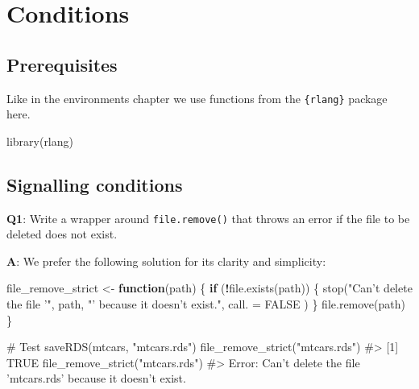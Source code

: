 \documentclass[
]{krantz}
\makeatletter
\newenvironment{Shaded}{\begin{snugshade}}{\end{snugshade}}
\newcommand{\CommentTok}[1]{\textcolor[rgb]{0.56,0.35,0.01}{\textit{#1}}}
\newcommand{\ControlFlowTok}[1]{\textcolor[rgb]{0.13,0.29,0.53}{\textbf{#1}}}
\newcommand{\DataTypeTok}[1]{\textcolor[rgb]{0.13,0.29,0.53}{#1}}
\newcommand{\KeywordTok}[1]{\textcolor[rgb]{0.13,0.29,0.53}{\textbf{#1}}}
\newcommand{\NormalTok}[1]{#1}
\newcommand{\OperatorTok}[1]{\textcolor[rgb]{0.81,0.36,0.00}{\textbf{#1}}}
\newcommand{\OtherTok}[1]{\textcolor[rgb]{0.56,0.35,0.01}{#1}}
\newcommand{\StringTok}[1]{\textcolor[rgb]{0.31,0.60,0.02}{#1}}
\newenvironment{kframe}{%
\medskip{}
\setlength{\fboxsep}{.8em}
 \def\at@end@of@kframe{}%
 \ifinner\ifhmode%
  \def\at@end@of@kframe{\end{minipage}}%
  \begin{minipage}{\columnwidth}%
 \fi\fi%
 \def\FrameCommand##1{\hskip\@totalleftmargin \hskip-\fboxsep
 \colorbox{shadecolor}{##1}\hskip-\fboxsep
     \hskip-\linewidth \hskip-\@totalleftmargin \hskip\columnwidth}%
 \MakeFramed {\advance\hsize-\width
   \@totalleftmargin\z@ \linewidth\hsize
   \@setminipage}}%
 {\par\unskip\endMakeFramed%
 \at@end@of@kframe}
\renewenvironment{Shaded}{\begin{kframe}}{\end{kframe}}
\renewcommand{\KeywordTok} [1]{\textcolor[rgb]{0.00,0.44,0.13}{{#1}}}
\renewcommand{\DataTypeTok}[1]{\textcolor[rgb]{0.56,0.13,0.00}{{#1}}}
\renewcommand{\StringTok}  [1]{\textcolor[rgb]{0.25,0.44,0.63}{{#1}}}
\renewcommand{\CommentTok} [1]{\textcolor[rgb]{0.38,0.63,0.69}{{#1}}}
\renewcommand{\OtherTok}   [1]{\textcolor[rgb]{0.00,0.44,0.13}{{#1}}}
\renewcommand{\NormalTok}  [1]{{#1}}
\makeatother
\begin{document}
\hypertarget{conditions}{%
\chapter{Conditions}\label{conditions}}

\hypertarget{prerequisites-2}{%
\section*{Prerequisites}\label{prerequisites-2}}


Like in the environments chapter we use functions from the \texttt{\{rlang\}} package here.

\begin{Shaded}
\begin{Highlighting}[]
\KeywordTok{library}\NormalTok{(rlang)}
\end{Highlighting}
\end{Shaded}


\hypertarget{signalling-conditions}{%
\section{Signalling conditions}\label{signalling-conditions}}

\textbf{{Q1}}: Write a wrapper around \texttt{file.remove()} that throws an error if the file to be deleted does not exist.

\textbf{{A}}: We prefer the following solution for its clarity and simplicity:

\begin{Shaded}
\begin{Highlighting}[]
\NormalTok{file_remove_strict <-}\StringTok{ }\ControlFlowTok{function}\NormalTok{(path) \{}
  \ControlFlowTok{if}\NormalTok{ (}\OperatorTok{!}\KeywordTok{file.exists}\NormalTok{(path)) \{}
    \KeywordTok{stop}\NormalTok{(}\StringTok{"Can't delete the file '"}\NormalTok{, path, }\StringTok{"' because it doesn't exist."}\NormalTok{,}
      \DataTypeTok{call. =} \OtherTok{FALSE}
\NormalTok{    )}
\NormalTok{  \}}
  \KeywordTok{file.remove}\NormalTok{(path)}
\NormalTok{\}}

\CommentTok{# Test}
\KeywordTok{saveRDS}\NormalTok{(mtcars, }\StringTok{"mtcars.rds"}\NormalTok{)}
\KeywordTok{file_remove_strict}\NormalTok{(}\StringTok{"mtcars.rds"}\NormalTok{)}
\CommentTok{#> [1] TRUE}
\KeywordTok{file_remove_strict}\NormalTok{(}\StringTok{"mtcars.rds"}\NormalTok{)}
\CommentTok{#> Error: Can't delete the file 'mtcars.rds' because it doesn't exist.}
\end{Highlighting}
\end{Shaded}
\end{document}
